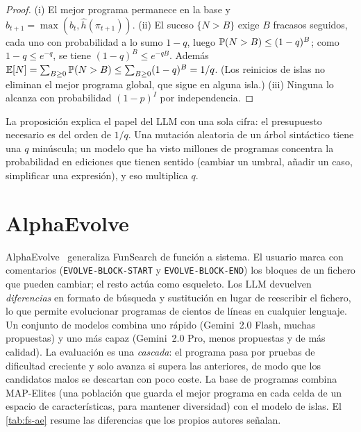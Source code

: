 \begin{proof}
(i) El mejor programa permanece en la base y $b_{t+1}=\max(b_t,\hat h(\pi_{t+1}))$. (ii) El suceso $\{N>B\}$ exige $B$ fracasos seguidos, cada uno con probabilidad a lo sumo $1-q$, luego $\mathbb{P}(N>B)\le(1-q)^B$; como $1-q\le e^{-q}$, se tiene $(1-q)^B\le e^{-qB}$. Además $\mathbb{E}[N]=\sum_{B\ge 0}\mathbb{P}(N>B)\le\sum_{B\ge0}(1-q)^B=1/q$. (Los reinicios de islas no eliminan el mejor programa global, que sigue en alguna isla.) (iii) Ninguna lo alcanza con probabilidad $(1-p)^I$ por independencia.
\end{proof}

La proposición explica el papel del LLM con una sola cifra: el presupuesto necesario es del orden de $1/q$. Una mutación aleatoria de un árbol sintáctico tiene una $q$ minúscula; un modelo que ha visto millones de programas concentra la probabilidad en ediciones que tienen sentido (cambiar un umbral, añadir un caso, simplificar una expresión), y eso multiplica $q$.

\section{AlphaEvolve}

AlphaEvolve~\cite{alphaevolve} generaliza FunSearch de función a sistema. El usuario marca con comentarios (\texttt{EVOLVE-BLOCK-START} y \texttt{EVOLVE-BLOCK-END}) los bloques de un fichero que pueden cambiar; el resto actúa como esqueleto. Los LLM devuelven \emph{diferencias} en formato de búsqueda y sustitución en lugar de reescribir el fichero, lo que permite evolucionar programas de cientos de líneas en cualquier lenguaje. Un conjunto de modelos combina uno rápido (Gemini~2.0 Flash, muchas propuestas) y uno más capaz (Gemini~2.0 Pro, menos propuestas y de más calidad). La evaluación es una \emph{cascada}: el programa pasa por pruebas de dificultad creciente y solo avanza si supera las anteriores, de modo que los candidatos malos se descartan con poco coste. La base de programas combina MAP-Elites (una población que guarda el mejor programa en cada celda de un espacio de características, para mantener diversidad) con el modelo de islas. El \cref{tab:fs-ae} resume las diferencias que los propios autores señalan.

